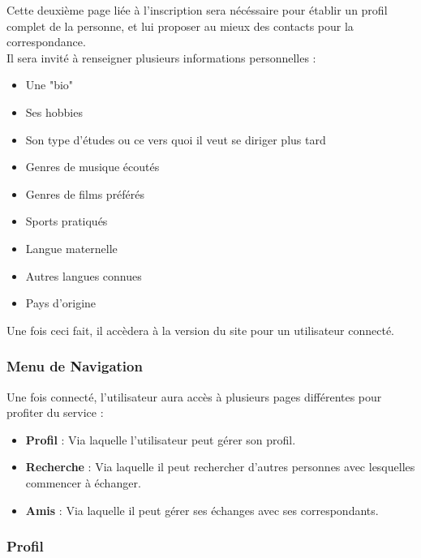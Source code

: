 \documentclass[a4paper,10pt,final,fleqn]{article}
\begin{document}
				Cette deuxième page liée à l'inscription sera nécéssaire pour établir un profil complet de la personne, et lui proposer au mieux des contacts pour la correspondance.\\
				Il sera invité à renseigner plusieurs informations personnelles : \\

				\begin{itemize}
					\item Une "bio"
					\item Ses hobbies
					\item Son type d'études ou ce vers quoi il veut se diriger plus tard
					\item Genres de musique écoutés
					\item Genres de films préférés
					\item Sports pratiqués
					\item Langue maternelle
					\item Autres langues connues
					\item Pays d'origine\\
				\end{itemize}


				Une fois ceci fait, il accèdera à la version du site pour un utilisateur connecté.\\

			\subsubsection{Menu de Navigation}

				Une fois connecté, l'utilisateur aura accès à plusieurs pages différentes pour profiter du service : \\

				\begin{itemize}
					\item \textbf{Profil} : Via laquelle l'utilisateur peut gérer son profil.

					\item \textbf{Recherche} : Via laquelle il peut rechercher d'autres personnes avec lesquelles commencer à échanger.

					\item \textbf{Amis} : Via laquelle il peut gérer ses échanges avec ses correspondants.
				\end{itemize}

			\subsubsection{Profil}
\end{document}
